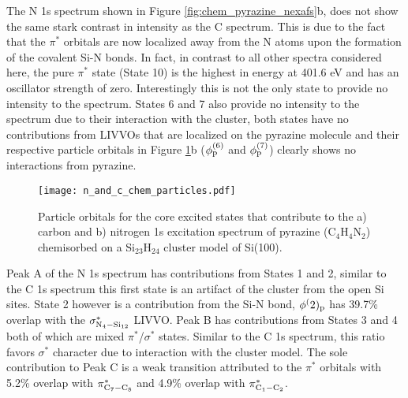 \documentclass{article}
\begin{document}
The N 1s spectrum shown in Figure \ref{fig:chem_pyrazine_nexafs}b, does not show the same stark contrast in intensity as the C spectrum. This is due to the fact that the $\pi^*$ orbitals are now localized away from the N atoms upon the formation of the covalent Si-N bonds. In fact, in contrast to all other spectra considered here, the pure $\pi^*$ state (State 10) is the highest in energy at 401.6 eV and has an oscillator strength of zero. Interestingly this is not the only state to provide no intensity to the spectrum. States 6 and 7 also provide no intensity to the spectrum due to their interaction with the cluster, both states have no contributions from LIVVOs that are localized on the pyrazine molecule and their respective particle orbitals in Figure \ref{fig:chem_pyrazine_parts}b ($\phi^{(6)}_{\rm p}$ and $\phi^{(7)}_{\rm p}$) clearly shows no interactions from pyrazine. 

\begin{figure}[t!]
\centering
\texttt{[image: n\_and\_c\_chem\_particles.pdf]}
\caption{Particle orbitals for the core excited states that contribute to the a) carbon and b) nitrogen 1s excitation spectrum of pyrazine (C$_4$H$_4$N$_2$) chemisorbed on a Si$_{23}$H$_{24}$ cluster model of Si(100).}
\label{fig:chem_pyrazine_parts}
\end{figure}

Peak A of the N 1s spectrum has contributions from States 1 and 2, similar to the C 1s spectrum this first state is an artifact of the cluster from the open Si sites. State 2 however is a contribution from the Si-N bond, $\phi^(2)_{\rm p}$ has 39.7\% overlap with the $\sigma^*_{\rm N_4-Si_{12}}$ LIVVO. Peak B has contributions from States 3 and 4 both of which are mixed $\pi^*$/$\sigma^*$ states. Similar to the C 1s spectrum, this ratio favors $\sigma^*$ character due to interaction with the cluster model. The sole contribution to Peak C is a weak transition attributed to the $\pi^*$ orbitals with 5.2\% overlap with $\pi^*_{\rm C_7-C_8}$ and 4.9\% overlap with $\pi^*_{\rm C_1-C_2}$.  
\end{document}
